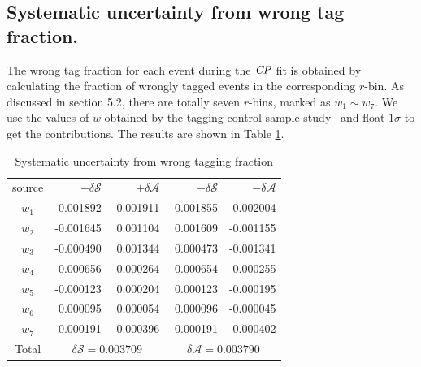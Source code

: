 \subsection{Systematic uncertainty from wrong tag fraction.}
The wrong tag fraction for each event during the $\it{CP}$ fit is obtained by calculating the fraction of wrongly tagged events in the corresponding $r$-bin. As discussed in section 5.2, there are totally seven $r$-bins, marked as $w_1 \sim w_7$. We use the values of $w$ obtained by the tagging control sample study~\cite{abudinen2020first} and float $1\sigma$ to get the contributions. The results are shown in Table \ref{tab:sy_wtag}.
\begin{table}[htpb]
	\begin{minipage}[b]{1.0\linewidth}
		\centering
		\caption{Systematic uncertainty from wrong tagging fraction}
		\label{tab:sy_wtag}
		\begin{tabular}{c r r r r}
			\hline
			source & $+\delta \mathcal{S}$ & $+\delta \mathcal{A}$ & $-\delta \mathcal{S}$ &  $-\delta \mathcal{A}$\\
			$w_1$ & -0.001892
			& 0.001911
			& 0.001855
			& -0.002004
			\\
			$ w_2$ & -0.001645
			& 0.001104
			& 0.001609
			& -0.001155
			\\
			$ w_3$ & -0.000490
			& 0.001344
			& 0.000473
			& -0.001341
			\\
			$ w_4$ & 0.000656
			& 0.000264
			& -0.000654
			& -0.000255 \\
			$ w_5$ & -0.000123
			& 0.000204
			& 0.000123 &
			-0.000195
			\\
			$ w_6$ & 0.000095 & 0.000054 & 0.000096 & -0.000045 \\
			$ w_7$ & 0.000191
			& -0.000396
			& -0.000191
			& 0.000402
			\\
			\hline
			Total &
			\multicolumn{2}{c}{$\delta \mathcal{S}=0.003709$} &
			\multicolumn{2}{c}{$\delta \mathcal{A}=0.003790$}\\
			\hline
		\end{tabular}
	\end{minipage}
\end{table}

